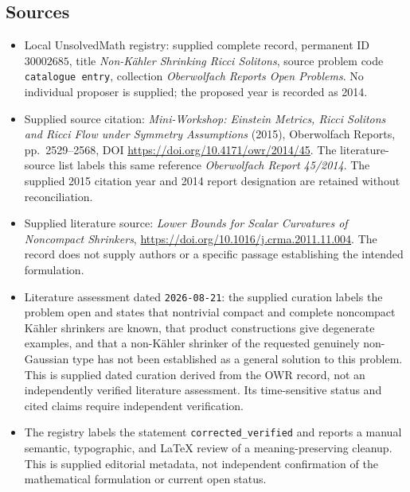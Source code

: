 \documentclass[11pt]{article}
\begin{document}
\subsection{Sources}
\begin{itemize}
\item Local UnsolvedMath registry: supplied complete record, permanent ID \(30002685\), title \emph{Non-K\"ahler Shrinking Ricci Solitons}, source problem code \texttt{catalogue entry}, collection \emph{Oberwolfach Reports Open Problems}. No individual proposer is supplied; the proposed year is recorded as 2014.
\item Supplied source citation: \emph{Mini-Workshop: Einstein Metrics, Ricci Solitons and Ricci Flow under Symmetry Assumptions} (2015), Oberwolfach Reports, pp.\ 2529--2568, DOI \url{https://doi.org/10.4171/owr/2014/45}. The literature-source list labels this same reference \emph{Oberwolfach Report 45/2014}. The supplied 2015 citation year and 2014 report designation are retained without reconciliation.
\item Supplied literature source: \emph{Lower Bounds for Scalar Curvatures of Noncompact Shrinkers}, \url{https://doi.org/10.1016/j.crma.2011.11.004}. The record does not supply authors or a specific passage establishing the intended formulation.
\item Literature assessment dated \texttt{2026-08-21}: the supplied curation labels the problem open and states that nontrivial compact and complete noncompact K\"ahler shrinkers are known, that product constructions give degenerate examples, and that a non-K\"ahler shrinker of the requested genuinely non-Gaussian type has not been established as a general solution to this problem. This is supplied dated curation derived from the OWR record, not an independently verified literature assessment. Its time-sensitive status and cited claims require independent verification.
\item The registry labels the statement \texttt{corrected\_verified} and reports a manual semantic, typographic, and LaTeX review of a meaning-preserving cleanup. This is supplied editorial metadata, not independent confirmation of the mathematical formulation or current open status.
\end{itemize}
\end{document}
